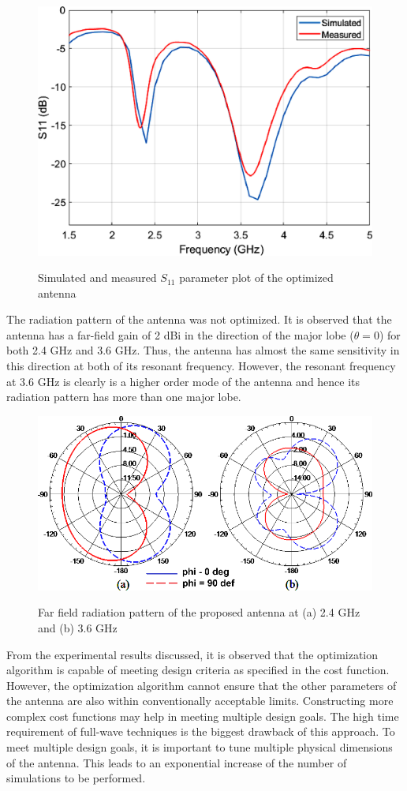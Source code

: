 \begin{figure}
\centering
\includegraphics[width=0.7\linewidth]{bc-s11_res.eps}\\
\caption{Simulated and measured $S_{11}$ parameter plot of the optimized antenna}\label{fig-s11-opt}
\end{figure}

The radiation pattern of the antenna was not optimized. It is observed that the antenna has a far-field gain of 2 dBi in the direction of the major lobe ($\theta=0$) for both 2.4 GHz and 3.6 GHz. Thus, the antenna has almost the same sensitivity in this direction at both of its resonant frequency. However, the resonant frequency at 3.6 GHz is clearly is a higher order mode of the antenna and hence its radiation pattern has more than one major lobe.

\begin{figure}[h]
\centering
\includegraphics[width=0.7\linewidth]{bc-patterns.eps}\\
\caption{Far field radiation pattern of the proposed antenna at (a) 2.4 GHz and (b) 3.6 GHz}\label{fig-pattern}
\end{figure}

From the experimental results discussed, it is observed that the optimization algorithm is capable of meeting design criteria as specified in the cost function. However, the optimization algorithm cannot ensure that the other parameters of the antenna are also within conventionally acceptable limits. Constructing more complex cost functions may help in meeting multiple design goals. The high time requirement of full-wave techniques is the biggest drawback of this approach. To meet multiple design goals, it is important to tune multiple physical dimensions of the antenna. This leads to an exponential increase of the number of simulations to be performed.

